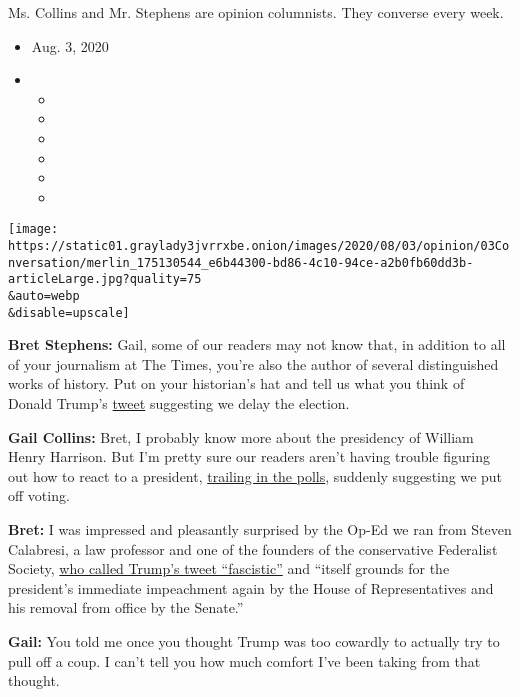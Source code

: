 Ms. Collins and Mr. Stephens are opinion columnists. They converse every
week.

\begin{itemize}
\item
  Aug. 3, 2020
\item
  \begin{itemize}
  \item
  \item
  \item
  \item
  \item
  \item
  \end{itemize}
\end{itemize}

\texttt{[image: https://static01.graylady3jvrrxbe.onion/images/2020/08/03/opinion/03Conversation/merlin\_175130544\_e6b44300-bd86-4c10-94ce-a2b0fb60dd3b-articleLarge.jpg?quality=75\\\&auto=webp\\\&disable=upscale]}

\textbf{Bret Stephens:} Gail, some of our readers may not know that, in
addition to all of your journalism at The Times, you're also the author
of several distinguished works of history. Put on your historian's hat
and tell us what you think of Donald Trump's
\href{https://twitter.com/realDonaldTrump/status/1288818160389558273?ref_src=twsrc\%5Etfw\%7Ctwcamp\%5Etweetembed\%7Ctwterm\%5E1288818160389558273\%7Ctwgr\%5E\&ref_url=https\%3A\%2F\%2Fwww.nytimes3xbfgragh.onion\%2F2020\%2F07\%2F30\%2Fopinion\%2Ftrump-delay-election-coronavirus.html}{tweet}
suggesting we delay the election.

\textbf{Gail Collins:} Bret, I probably know more about the presidency
of William Henry Harrison. But I'm pretty sure our readers aren't having
trouble figuring out how to react to a president,
\href{https://projects.fivethirtyeight.com/polls/president-general/}{trailing
in the polls}, suddenly suggesting we put off voting.

\textbf{Bret:} I was impressed and pleasantly surprised by the Op-Ed we
ran from Steven Calabresi, a law professor and one of the founders of
the conservative Federalist Society,
\href{https://www.nytimes3xbfgragh.onion/2020/07/30/opinion/trump-delay-election-coronavirus.html}{who
called Trump's tweet ``fascistic''} and ``itself grounds for the
president's immediate impeachment again by the House of Representatives
and his removal from office by the Senate.''

\textbf{Gail:} You told me once you thought Trump was too cowardly to
actually try to pull off a coup. I can't tell you how much comfort I've
been taking from that thought.


